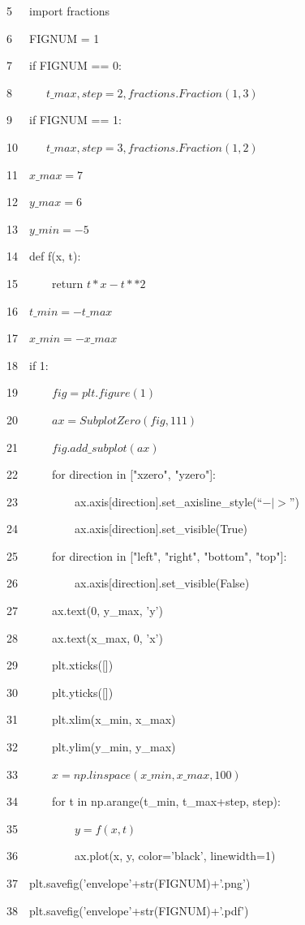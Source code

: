 \documentclass{jsarticle}
\begin{document}
5~~~import fractions

6~~~FIGNUM = 1 

7~~~if FIGNUM == 0:

8~~~~~~$t\_max, step = 2, fractions.Fraction(1,3)$
    
9~~~if FIGNUM == 1:

10~~~~~$t\_max, step = 3, fractions.Fraction(1,2)$

11~~$x\_max = 7$

12~~$y\_max = 6$

13~~$y\_min = -5$

14~~def f(x, t):

15~~~~~~return $t*x-t**2$

16~~$t\_min = -t\_max$

17~~$x\_min = -x\_max$

18~~if 1:

19~~~~~~$fig = plt.figure(1)$
    
20~~~~~~$ax = SubplotZero(fig, 111)$
    
21~~~~~~$fig.add\_subplot(ax)$

22~~~~~~for direction in ["xzero", "yzero"]:
    
23~~~~~~~~~~ax.axis[direction].set\_axisline\_style(``$-{\mid}>$'')
        
24~~~~~~~~~~ax.axis[direction].set\_visible(True)

25~~~~~~for direction in ["left", "right", "bottom", "top"]:
    
26~~~~~~~~~~ax.axis[direction].set\_visible(False)

27~~~~~~ax.text(0, y\_max, 'y')
    
28~~~~~~ax.text(x\_max, 0, 'x')
    
29~~~~~~plt.xticks([])
    
30~~~~~~plt.yticks([])
    
31~~~~~~plt.xlim(x\_min, x\_max)
    
32~~~~~~plt.ylim(y\_min, y\_max)

33~~~~~~$x = np.linspace(x\_min, x\_max, 100)$

34~~~~~~for t in np.arange(t\_min, t\_max+step, step):
    
35~~~~~~~~~~$y = f(x, t)$

36~~~~~~~~~~ax.plot(x, y, color='black', linewidth=1)

37~~plt.savefig('envelope'+str(FIGNUM)+'.png')

38~~plt.savefig('envelope'+str(FIGNUM)+'.pdf')
\end{document}
